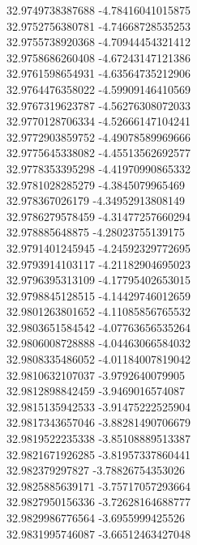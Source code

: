 {32.9749738387688	-4.78416041015875\\
32.9752756380781	-4.74668728535253\\
32.9755738920368	-4.70944454321412\\
32.9758686260408	-4.67243147121386\\
32.9761598654931	-4.63564735212906\\
32.9764476358022	-4.59909146410569\\
32.9767319623787	-4.56276308072033\\
32.9770128706334	-4.52666147104241\\
32.9772903859752	-4.49078589969666\\
32.9775645338082	-4.45513562692577\\
32.9778353395298	-4.41970990865332\\
32.9781028285279	-4.3845079965469\\
32.978367026179	-4.34952913808149\\
32.9786279578459	-4.31477257660294\\
32.978885648875	-4.28023755139175\\
32.9791401245945	-4.24592329772695\\
32.9793914103117	-4.21182904695023\\
32.9796395313109	-4.17795402653015\\
32.9798845128515	-4.14429746012659\\
32.9801263801652	-4.11085856765532\\
32.9803651584542	-4.07763656535264\\
32.9806008728888	-4.04463066584032\\
32.9808335486052	-4.01184007819042\\
32.9810632107037	-3.9792640079905\\
32.9812898842459	-3.9469016574087\\
32.9815135942533	-3.91475222525904\\
32.9817343657046	-3.88281490706679\\
32.9819522235338	-3.85108889513387\\
32.9821671926285	-3.81957337860441\\
32.982379297827	-3.78826754353026\\
32.9825885639171	-3.75717057293664\\
32.9827950156336	-3.72628164688777\\
32.9829986776564	-3.6955999425526\\
32.9831995746087	-3.66512463427048\\
}
